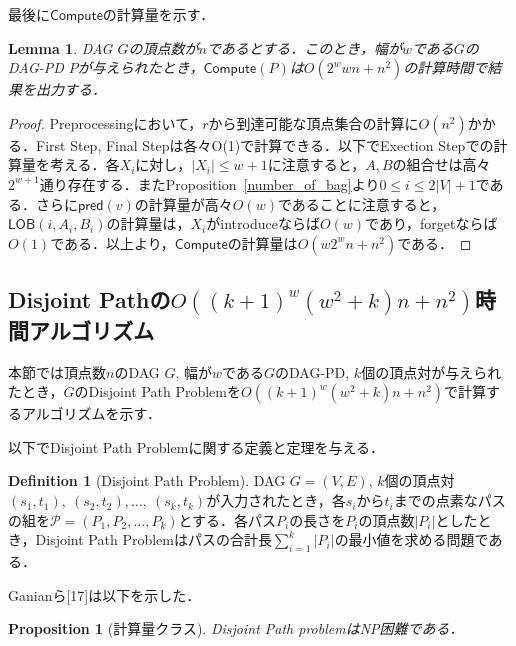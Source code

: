 \documentclass[master]{kuisthesis}		%
\theoremstyle{plain}
\newtheorem{proposition}{Proposition}
\newtheorem{lemma}{Lemma}
\theoremstyle{definition}
\newtheorem{definition*}{Definition}
\begin{document}
最後に$\mathsf{Compute}$の計算量を示す．

\begin{lemma}
    DAG $G$の頂点数が$n$であるとする．このとき，幅が$w$である$G$のDAG-PD $P$が与えられたとき，$\mathsf{Compute}(P)$は$O(2^wwn + n^2)$の計算時間で結果を出力する．
\end{lemma}

\begin{proof}
    Preprocessingにおいて，$r$から到達可能な頂点集合の計算に$O(n^2)$かかる．First Step, Final Stepは各々O(1)で計算できる．以下でExection Stepでの計算量を考える．各$X_i$に対し，$|X_i| \leq w+1$に注意すると，$A, B$の組合せは高々$2^{w+1}$通り存在する．またProposition~\ref{number_of_bag}より$0 \leq i \leq 2|V|+1$である．さらに$\mathsf{pred}(v)$の計算量が高々$O(w)$であることに注意すると，$\mathsf{LOB}(i, A_i, B_i)$の計算量は，$X_i$がintroduceならば$O(w)$であり，forgetならば$O(1)$である．以上より，$\mathsf{Compute}$の計算量は$O(w2^wn+n^2)$である．
\end{proof}














\subsection{Disjoint Pathの$O((k+1)^w(w^2+k)n+n^2)$時間アルゴリズム}

本節では頂点数$n$のDAG $G$, 幅が$w$である$G$のDAG-PD, $k$個の頂点対が与えられたとき，$G$のDisjoint Path Problemを$O((k+1)^w(w^2+k)n+n^2)$で計算するアルゴリズムを示す．


以下でDisjoint Path Problemに関する定義と定理を与える．

\begin{definition*}[Disjoint Path Problem]
    DAG $G=(V, E)$, $k$個の頂点対$(s_1, t_1),\ (s_2, t_2), \dots ,\ (s_k, t_k)$が入力されたとき，各$s_i$から$t_i$までの点素なパスの組を$\mathcal{P}=(P_1, P_2, \dots , P_k)$とする．各パス$P_i$の長さを$P_i$の頂点数$|P_i|$としたとき，Disjoint Path Problemはパスの合計長$\sum_{i=1}^k |P_i|$の最小値を求める問題である．
\end{definition*}

Ganianら[17]は以下を示した．

\begin{proposition}[計算量クラス]
    Disjoint Path problemはNP困難である．
\end{proposition}
\end{document}
